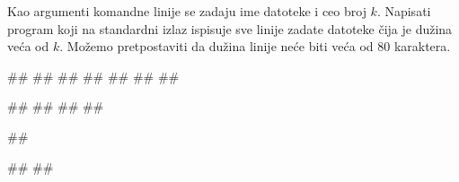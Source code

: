 \begin{Exercise}[label=p3_03] 
 Kao argumenti komandne linije se zadaju ime datoteke i ceo broj $k$. Napisati program koji na  standardni izlaz ispisuje sve linije zadate datoteke čija je dužina veća od $k$. Možemo pretpostaviti da dužina linije neće biti veća od 80 karaktera.\\
\begin{miditest}
\begin{upotreba}{1}
##
##
##
##
##
##
##

#\naslovIzlaz#
##
##
##
\end{upotreba}
\end{miditest}
\begin{miditest}
\begin{upotreba}{2}
##

#\naslovIzlaz#
##
\end{upotreba}
\end{miditest}
\end{Exercise}
\begin{Answer}[ref=p3_03]
\end{Answer}

